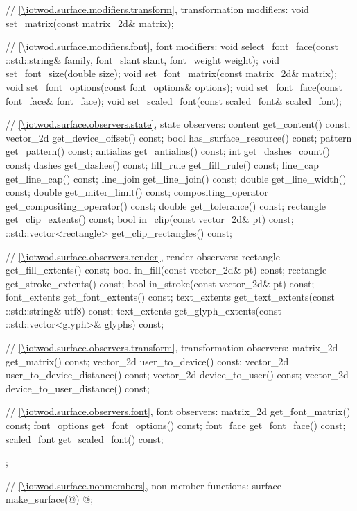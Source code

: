\begin{codeblock}
{{{{{    // \ref{\iotwod.surface.modifiers.transform}, transformation modifiers:
    void set_matrix(const matrix_2d& matrix);

    // \ref{\iotwod.surface.modifiers.font}, font modifiers:
    void select_font_face(const ::std::string& family, font_slant slant, 
      font_weight weight);
    void set_font_size(double size);
    void set_font_matrix(const matrix_2d& matrix);
    void set_font_options(const font_options& options);
    void set_font_face(const font_face& font_face);
    void set_scaled_font(const scaled_font& scaled_font);

    // \ref{\iotwod.surface.observers.state}, state observers:
    content get_content() const;
    vector_2d get_device_offset() const;
    bool has_surface_resource() const;
    pattern get_pattern() const;
    antialias get_antialias() const;
    int get_dashes_count() const;
    dashes get_dashes() const;
    fill_rule get_fill_rule() const;
    line_cap get_line_cap() const;
    line_join get_line_join() const;
    double get_line_width() const;
    double get_miter_limit() const;
    compositing_operator get_compositing_operator() const;
    double get_tolerance() const;
    rectangle get_clip_extents() const;
    bool in_clip(const vector_2d& pt) const;
    ::std::vector<rectangle> get_clip_rectangles() const;

    // \ref{\iotwod.surface.observers.render}, render observers:
    rectangle get_fill_extents() const;
    bool in_fill(const vector_2d& pt) const;
    rectangle get_stroke_extents() const;
    bool in_stroke(const vector_2d& pt) const;
    font_extents get_font_extents() const;
    text_extents get_text_extents(const ::std::string& utf8) const;
    text_extents get_glyph_extents(const ::std::vector<glyph>& glyphs) const;

    // \ref{\iotwod.surface.observers.transform}, transformation observers:
    matrix_2d get_matrix() const;
    vector_2d user_to_device() const;
    vector_2d user_to_device_distance() const;
    vector_2d device_to_user() const;
    vector_2d device_to_user_distance() const;

    // \ref{\iotwod.surface.observers.font}, font observers:
    matrix_2d get_font_matrix() const;
    font_options get_font_options() const;
    font_face get_font_face() const;
    scaled_font get_scaled_font() const;
  };
  
  // \ref{\iotwod.surface.nonmembers}, non-member functions:
  surface make_surface(@\impdef@) @\impdef@;
} } } }
\end{codeblock}

